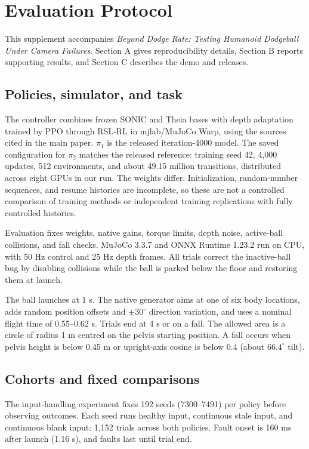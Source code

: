 \section{Evaluation Protocol}
\label{app:protocol}
This supplement accompanies \emph{Beyond Dodge Rate: Testing Humanoid Dodgeball
Under Camera Failures}. Section A gives reproducibility details, Section B
reports supporting results, and Section C describes the demo and releases.

\subsection{Policies, simulator, and task}
The controller combines frozen SONIC and Theia bases with depth adaptation
trained by PPO through RSL-RL in mjlab/MuJoCo Warp, using the sources cited in
the main paper. $\pi_1$ is the released iteration-4000 model. The saved
configuration for $\pi_2$ matches the released reference: training seed 42,
4,000 updates, 512 environments, and about 49.15 million transitions,
distributed across eight GPUs in our run. The weights differ. Initialization,
random-number sequences, and resume histories are incomplete, so these are
not a controlled comparison of training methods or independent training
replications with fully controlled histories.

Evaluation fixes weights, native gains, torque limits, depth noise,
active-ball collisions, and fall checks. MuJoCo 3.3.7 and ONNX Runtime 1.23.2
run on CPU, with 50 Hz control and 25 Hz depth frames. All trials correct the
inactive-ball bug by disabling collisions while the ball is parked below the
floor and restoring them at launch.

The ball launches at 1 s. The native generator aims at one of six body
locations, adds random position offsets and $\pm30^\circ$ direction variation,
and uses a nominal flight time of 0.55--0.62 s. Trials end at 4 s or on a fall.
The allowed area is a circle of radius 1 m centred on the pelvis starting
position. A fall occurs when pelvis height is below 0.45 m or upright-axis
cosine is below 0.4 (about $66.4^\circ$ tilt).

\subsection{Cohorts and fixed comparisons}
The input-handling experiment fixes 192 seeds (7300--7491) per policy before
observing outcomes. Each seed runs healthy input, continuous stale input, and
continuous blank input: 1,152 trials across both policies. Fault onset is
160 ms after launch (1.16 s), and faults last until trial end.

